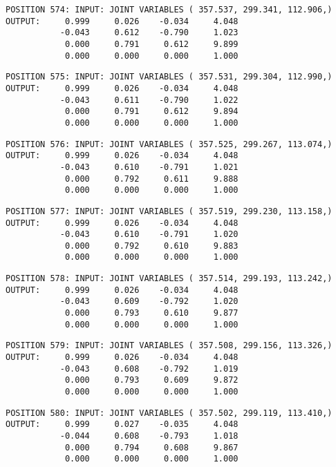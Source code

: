 \begin{verbatim}
POSITION 574: INPUT: JOINT VARIABLES ( 357.537, 299.341, 112.906,)
OUTPUT:     0.999     0.026    -0.034     4.048
           -0.043     0.612    -0.790     1.023
            0.000     0.791     0.612     9.899
            0.000     0.000     0.000     1.000
\end{verbatim} \pagebreak[1]\begin{verbatim}
POSITION 575: INPUT: JOINT VARIABLES ( 357.531, 299.304, 112.990,)
OUTPUT:     0.999     0.026    -0.034     4.048
           -0.043     0.611    -0.790     1.022
            0.000     0.791     0.612     9.894
            0.000     0.000     0.000     1.000
\end{verbatim} \pagebreak[1]\begin{verbatim}
POSITION 576: INPUT: JOINT VARIABLES ( 357.525, 299.267, 113.074,)
OUTPUT:     0.999     0.026    -0.034     4.048
           -0.043     0.610    -0.791     1.021
            0.000     0.792     0.611     9.888
            0.000     0.000     0.000     1.000
\end{verbatim} \pagebreak[1]\begin{verbatim}
POSITION 577: INPUT: JOINT VARIABLES ( 357.519, 299.230, 113.158,)
OUTPUT:     0.999     0.026    -0.034     4.048
           -0.043     0.610    -0.791     1.020
            0.000     0.792     0.610     9.883
            0.000     0.000     0.000     1.000
\end{verbatim} \pagebreak[1]\begin{verbatim}
POSITION 578: INPUT: JOINT VARIABLES ( 357.514, 299.193, 113.242,)
OUTPUT:     0.999     0.026    -0.034     4.048
           -0.043     0.609    -0.792     1.020
            0.000     0.793     0.610     9.877
            0.000     0.000     0.000     1.000
\end{verbatim} \pagebreak[1]\begin{verbatim}
POSITION 579: INPUT: JOINT VARIABLES ( 357.508, 299.156, 113.326,)
OUTPUT:     0.999     0.026    -0.034     4.048
           -0.043     0.608    -0.792     1.019
            0.000     0.793     0.609     9.872
            0.000     0.000     0.000     1.000
\end{verbatim} \pagebreak[1]\begin{verbatim}
POSITION 580: INPUT: JOINT VARIABLES ( 357.502, 299.119, 113.410,)
OUTPUT:     0.999     0.027    -0.035     4.048
           -0.044     0.608    -0.793     1.018
            0.000     0.794     0.608     9.867
            0.000     0.000     0.000     1.000
\end{verbatim} \pagebreak[1]\begin{verbatim}

\end{verbatim}
